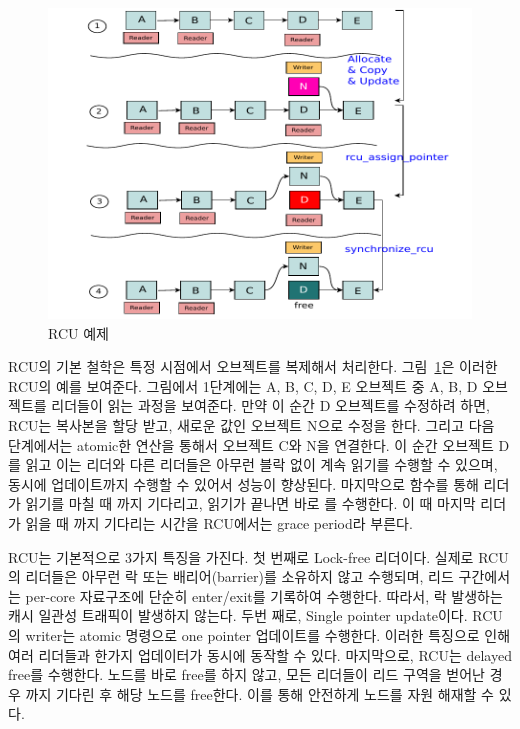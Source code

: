 \begin{figure}[h]
    \centering
    \includegraphics[width=1\textwidth]{fig/rcu/rcu_principle}
    \caption{RCU 예제}
  \label{fig:rcuprinciple}
\end{figure}

RCU의 기본 철학은 특정 시점에서 오브젝트를 복제해서 처리한다. 그림~\ref{fig:rcuprinciple}은 
이러한 RCU의 예를 보여준다.
그림에서 1단계에는 A, B, C, D, E 오브젝트 중 A, B, D 오브젝트를 리더들이 읽는 과정을 보여준다.
만약 이 순간 D 오브젝트를 수정하려 하면, RCU는 복사본을 할당 받고, 새로운 값인 오브젝트 N으로 수정을 한다.
그리고 다음 단계에서는 atomic한 연산을 통해서 오브젝트 C와 N을 연결한다. 
이 순간 오브젝트 D를 읽고 이는 리더와 다른 리더들은 아무런 블락 없이 계속 읽기를 수행할 수 있으며,
 동시에 업데이트까지 수행할 수 있어서 성능이 향상된다.
마지막으로  함수를 통해 리더가 읽기를 마칠 때 까지 기다리고, 읽기가 끝나면 
바로 를 수행한다. 
이 때 마지막 리더가 읽을 때 까지 기다리는 시간을 RCU에서는 grace period라 부른다. 

RCU는 기본적으로 3가지 특징을 가진다. 첫 번째로 Lock-free 리더이다.
실제로 RCU의 리더들은 아무런 락 또는 배리어(barrier)를 소유하지 않고 수행되며, 리드 구간에서는
 per-core 자료구조에 단순히 enter/exit를 기록하여 수행한다. 
따라서, 락 발생하는 캐시 일관성 트래픽이 발생하지 않는다.
두번 째로, Single pointer update이다.
RCU의 writer는 atomic 명령으로 one pointer 업데이트를 수행한다.
이러한 특징으로 인해 여러 리더들과 한가지 업데이터가 동시에 동작할 수 있다.  
마지막으로, RCU는 delayed free를 수행한다.
노드를 바로 free를 하지 않고, 모든 리더들이 리드 구역을 벋어난 경우 까지 
기다린 후 해당 노드를 free한다.
이를 통해 안전하게 노드를 자원 해재할 수 있다. 

